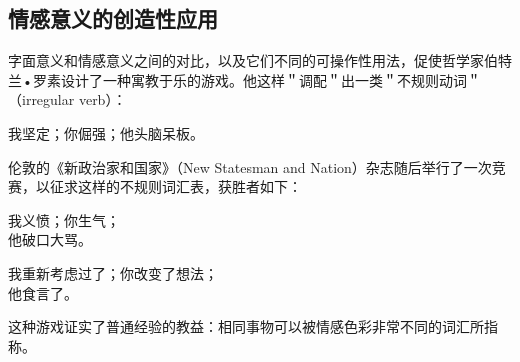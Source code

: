 \subsection{情感意义的创造性应用}

字面意义和情感意义之间的对比，以及它们不同的可操作性用法，促使哲学家伯特兰•罗素设计了一种寓教于乐的游戏。他这样＂调配＂出一类＂不规则动词＂（irregular verb）：

我坚定；你倔强；他头脑呆板。

伦敦的《新政治家和国家》（New Statesman and Nation）杂志随后举行了一次竞赛，以征求这样的不规则词汇表，获胜者如下：

我义愤；你生气；\\
他破口大骂。

我重新考虑过了；你改变了想法；\\
他食言了。

这种游戏证实了普通经验的教益：相同事物可以被情感色彩非常不同的词汇所指称。 

\begin{center}
\end{center} 